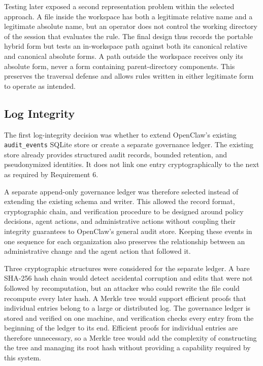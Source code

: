Testing later exposed a second representation problem within the selected
approach. A file inside the workspace has both a legitimate relative name and a
legitimate absolute name, but an operator does not control the working
directory of the session that evaluates the rule. The final design thus
records the portable hybrid form but tests an in-workspace path against both
its canonical relative and canonical absolute forms. A path outside the
workspace receives only its absolute form, never a form containing
parent-directory components. This preserves the traversal defense and allows
rules written in either legitimate form to operate as intended.

\subsection{Log Integrity}
\label{sec:gov-log-integrity}

The first log-integrity decision was whether to extend OpenClaw's existing
\texttt{audit\_events} SQLite store or create a separate governance ledger. The
existing store already provides structured audit records, bounded retention,
and pseudonymized identities. It does not link one entry cryptographically to
the next as required by Requirement 6.

A separate append-only governance ledger was therefore selected instead of
extending the existing schema and writer. This allowed the record format,
cryptographic chain, and verification procedure to be designed around policy
decisions, agent actions, and administrative actions without coupling their
integrity guarantees to OpenClaw's general audit store. Keeping these events in
one sequence for each organization also preserves the relationship between an
administrative change and the agent action that followed it.

Three cryptographic structures were considered for the separate ledger. A bare
SHA-256 hash chain would detect accidental corruption and edits that were not
followed by recomputation, but an attacker who could rewrite the file could
recompute every later hash. A Merkle tree would support efficient proofs that
individual entries belong to a large or distributed log. The governance ledger is stored and verified on one machine, and verification
checks every entry from the beginning of the ledger to its end. Efficient proofs
for individual entries are therefore unnecessary, so a Merkle tree would add
the complexity of constructing the tree and managing its root hash without
providing a capability required by this system.

